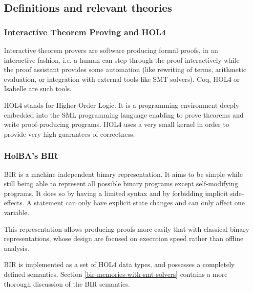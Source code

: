 \documentclass[10pt,a4paper]{article}
\begin{document}
\begin{multicols}{2}

\subsection{Definitions and relevant theories}

\subsubsection{Interactive Theorem Proving and HOL4} \label{hol4-presentation}

Interactive theorem provers are software producing formal proofs, in an
interactive fashion, i.e. a human can step through the proof interactively while the proof assistant provides some automation (like rewriting of terms, arithmetic evaluation, or integration with external tools like SMT solvers). Coq, HOL4 or Isabelle are such tools.

HOL4 stands for Higher-Order Logic. It is a programming environment deeply embedded into the {SML} programming language enabling to prove theorems and write {proof-producing} programs. HOL4 uses a very small kernel in order to provide very high guarantees of correctness.

\subsubsection{HolBA's BIR} \label{bir-presentation}

BIR is a machine independent binary representation. It aims to be simple while still being able to represent all possible binary programs except self-modifying programs. It does so by having a limited syntax and by forbidding implicit side-effects. A statement can only have explicit state changes and can only affect one variable.

This representation allows producing proofs more easily that with classical binary representations, whose design are focused on execution speed rather than offline analysis.

BIR is implemented as a set of HOL4 data types, and possesses a completely defined semantics. Section \ref{bir-memories-with-smt-solvers} contains a more thorough discussion of the BIR semantics.


\end{multicols}
\end{document}
